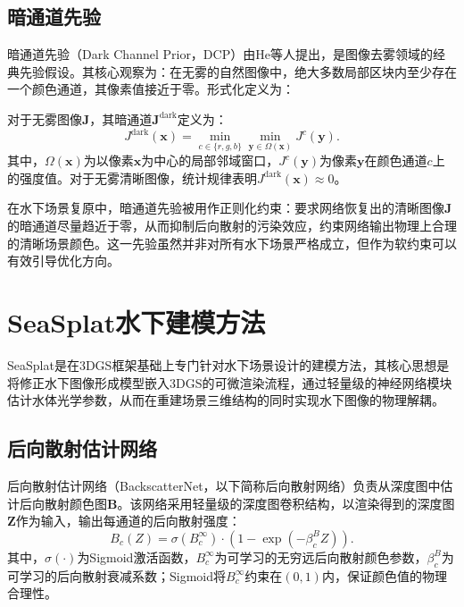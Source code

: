 \subsection{暗通道先验}

暗通道先验（Dark Channel Prior，DCP）由He等人提出，是图像去雾领域的经典先验假设。其核心观察为：在无雾的自然图像中，绝大多数局部区块内至少存在一个颜色通道，其像素值接近于零。形式化定义为：

对于无雾图像$\mathbf{J}$，其暗通道$\mathbf{J}^{\mathrm{dark}}$定义为：
\begin{equation}
    J^{\mathrm{dark}}(\mathbf{x}) = \min_{c \in \{r,g,b\}} \min_{\mathbf{y} \in \Omega(\mathbf{x})} J^c(\mathbf{y}).
    \label{eq:dark_channel}
\end{equation}其中，$\Omega(\mathbf{x})$为以像素$\mathbf{x}$为中心的局部邻域窗口，$J^c(\mathbf{y})$为像素$\mathbf{y}$在颜色通道$c$上的强度值。对于无雾清晰图像，统计规律表明$J^{\mathrm{dark}}(\mathbf{x}) \approx 0$。

在水下场景复原中，暗通道先验被用作正则化约束：要求网络恢复出的清晰图像$\mathbf{J}$的暗通道尽量趋近于零，从而抑制后向散射的污染效应，约束网络输出物理上合理的清晰场景颜色。这一先验虽然并非对所有水下场景严格成立，但作为软约束可以有效引导优化方向。

\section{SeaSplat水下建模方法}

SeaSplat是在3DGS框架基础上专门针对水下场景设计的建模方法，其核心思想是将修正水下图像形成模型嵌入3DGS的可微渲染流程，通过轻量级的神经网络模块估计水体光学参数，从而在重建场景三维结构的同时实现水下图像的物理解耦。

\subsection{后向散射估计网络}

后向散射估计网络（BackscatterNet，以下简称后向散射网络）负责从深度图中估计后向散射颜色图$\mathbf{B}$。该网络采用轻量级的深度图卷积结构，以渲染得到的深度图$\mathbf{Z}$作为输入，输出每通道的后向散射强度：
\begin{equation}
    B_c(Z) = \sigma(B_c^{\infty}) \cdot \left(1 - \exp(-\beta_c^B Z)\right).
    \label{eq:backscatter}
\end{equation}其中，$\sigma(\cdot)$为Sigmoid激活函数，$B_c^{\infty}$为可学习的无穷远后向散射颜色参数，$\beta_c^B$为可学习的后向散射衰减系数；Sigmoid将$B_c^{\infty}$约束在$(0,1)$内，保证颜色值的物理合理性。

